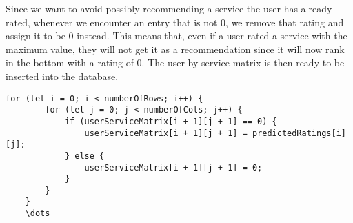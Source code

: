 Since we want to avoid possibly recommending a service the user has already rated, whenever we encounter an entry that is not 0, we remove that rating and assign it to be 0 instead.
This means that, even if a user rated a service with the maximum value, they will not get it as a recommendation since it will now rank in the bottom with a rating of 0.
The user by service matrix is then ready to be inserted into the database.
\begin{lstlisting}[caption={}, captionpos=b, label={}]
    for (let i = 0; i < numberOfRows; i++) {
        for (let j = 0; j < numberOfCols; j++) {
            if (userServiceMatrix[i + 1][j + 1] == 0) {
                userServiceMatrix[i + 1][j + 1] = predictedRatings[i][j];
            } else {
                userServiceMatrix[i + 1][j + 1] = 0;
            }
        }
    }
    \dots
\end{lstlisting}
